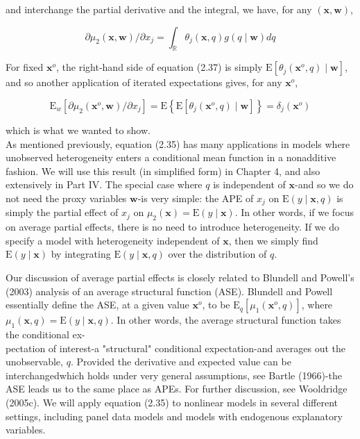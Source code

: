 \documentclass[10pt]{article}
\begin{document}
and interchange the partial derivative and the integral, we have, for any $(\mathbf{x}, \mathbf{w})$,


\begin{equation*}
\partial \mu_{2}(\mathbf{x}, \mathbf{w}) / \partial x_{j}=\int_{\mathbb{R}} \theta_{j}(\mathbf{x}, q) g(q \mid \mathbf{w}) d q \tag{2.37}
\end{equation*}


For fixed $\mathbf{x}^{o}$, the right-hand side of equation (2.37) is simply $\mathrm{E}\left[\theta_{j}\left(\mathbf{x}^{o}, q\right) \mid \mathbf{w}\right]$, and so another application of iterated expectations gives, for any $\mathbf{x}^{o}$,

$$
\mathrm{E}_{w}\left[\partial \mu_{2}\left(\mathbf{x}^{o}, \mathbf{w}\right) / \partial x_{j}\right]=\mathrm{E}\left\{\mathrm{E}\left[\theta_{j}\left(\mathbf{x}^{o}, q\right) \mid \mathbf{w}\right]\right\}=\delta_{j}\left(\mathbf{x}^{o}\right)
$$

which is what we wanted to show.\\
As mentioned previously, equation (2.35) has many applications in models where unobserved heterogeneity enters a conditional mean function in a nonadditive fashion. We will use this result (in simplified form) in Chapter 4, and also extensively in Part IV. The special case where $q$ is independent of $\mathbf{x}$-and so we do not need the proxy variables $\mathbf{w}$-is very simple: the APE of $x_{j}$ on $\mathrm{E}(y \mid \mathbf{x}, q)$ is simply the partial effect of $x_{j}$ on $\mu_{2}(\mathbf{x})=\mathrm{E}(y \mid \mathbf{x})$. In other words, if we focus on average partial effects, there is no need to introduce heterogeneity. If we do specify a model with heterogeneity independent of $\mathbf{x}$, then we simply find $\mathrm{E}(y \mid \mathbf{x})$ by integrating $\mathrm{E}(y \mid \mathbf{x}, q)$ over the distribution of $q$.

Our discussion of average partial effects is closely related to Blundell and Powell's (2003) analysis of an average structural function (ASE). Blundell and Powell essentially define the ASE, at a given value $\mathbf{x}^{o}$, to be $\mathrm{E}_{q}\left[\mu_{1}\left(\mathbf{x}^{o}, q\right)\right]$, where $\mu_{1}(\mathbf{x}, q)= \mathrm{E}(y \mid \mathbf{x}, q)$. In other words, the average structural function takes the conditional ex-\\
pectation of interest-a "structural" conditional expectation-and averages out the unobservable, $q$. Provided the derivative and expected value can be interchangedwhich holds under very general assumptions, see Bartle (1966)-the ASE leads us to the same place as APEs. For further discussion, see Wooldridge (2005c). We will apply equation (2.35) to nonlinear models in several different settings, including panel data models and models with endogenous explanatory variables.
\end{document}
